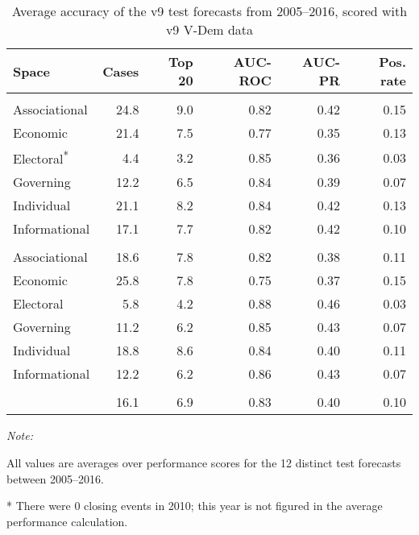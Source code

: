 \begin{table}

\caption{\label{tab:v9-test-acc}Average accuracy of the v9 test forecasts from 2005--2016, scored with v9 V-Dem data}
\centering
\begin{threeparttable}
\begin{tabular}[t]{lrrrrr}
\toprule
Space & Cases & Top 20 & AUC-ROC & AUC-PR & Pos. rate\\
\midrule
\addlinespace[0.3em]
\multicolumn{6}{l}{\textbf{Closing movement}}\\
\hspace{1em}Associational & 24.8 & 9.0 & 0.82 & 0.42 & 0.15\\
\hspace{1em}Economic & 21.4 & 7.5 & 0.77 & 0.35 & 0.13\\
\hspace{1em}Electoral\textsuperscript{*} & 4.4 & 3.2 & 0.85 & 0.36 & 0.03\\
\hspace{1em}Governing & 12.2 & 6.5 & 0.84 & 0.39 & 0.07\\
\hspace{1em}Individual & 21.1 & 8.2 & 0.84 & 0.42 & 0.13\\
\hspace{1em}Informational & 17.1 & 7.7 & 0.82 & 0.42 & 0.10\\
\addlinespace[0.3em]
\multicolumn{6}{l}{\textbf{Opening movement}}\\
\hspace{1em}Associational & 18.6 & 7.8 & 0.82 & 0.38 & 0.11\\
\hspace{1em}Economic & 25.8 & 7.8 & 0.75 & 0.37 & 0.15\\
\hspace{1em}Electoral & 5.8 & 4.2 & 0.88 & 0.46 & 0.03\\
\hspace{1em}Governing & 11.2 & 6.2 & 0.85 & 0.43 & 0.07\\
\hspace{1em}Individual & 18.8 & 8.6 & 0.84 & 0.40 & 0.11\\
\hspace{1em}Informational & 12.2 & 6.2 & 0.86 & 0.43 & 0.07\\
\addlinespace[0.3em]
\multicolumn{6}{l}{\textbf{Average}}\\
\hspace{1em} & 16.1 & 6.9 & 0.83 & 0.40 & 0.10\\
\bottomrule
\end{tabular}
\begin{tablenotes}
\item \textit{Note: } 
\item All values are averages over performance scores for the 12 distinct test forecasts between 2005--2016.
\item[*] There were 0 closing events in 2010; this year is not figured in the average performance calculation.
\end{tablenotes}
\end{threeparttable}
\end{table}
